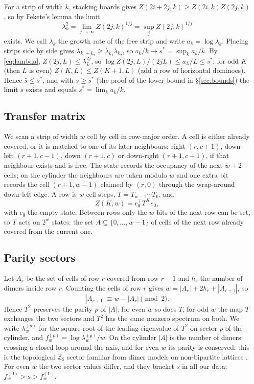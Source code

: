 \documentclass[11pt]{amsart}
\theoremstyle{definition}
\theoremstyle{remark}
\newcommand{\Z}{\mathbb{Z}}
\begin{document}
For a strip of width $k$, stacking boards gives $Z(2i + 2j, k) \ge Z(2i, k) Z(2j, k)$, so by
Fekete's lemma \cite{fekete1923} the limit
\begin{equation}\label{eq:lambda}
  \lambda_k^2 = \lim_{j \to \infty} Z(2j, k)^{1/j} = \sup_j Z(2j, k)^{1/j}
\end{equation}
exists. We call $\lambda_k$ the growth rate of the free strip and write $a_k = \log \lambda_k$.
Placing strips side by side gives $\lambda_{k_1 + k_2} \ge \lambda_{k_1}\lambda_{k_2}$, so
$a_k/k \to s^* = \sup_k a_k/k$. By \eqref{eq:lambda}, $Z(2j, L) \le \lambda_L^{2j}$, so
$\log Z(2j, L)/(2jL) \le a_L/L \le s^*$; for odd $K$ (then $L$ is even) $Z(K, L) \le Z(K+1, L)$
(add a row of horizontal dominoes). Hence $\bar s \le s^*$, and with $\underline s \ge s^*$ (the
proof of the lower bound in \S\ref{sec:bounds}) the limit $s$ exists and equals
$s^* = \lim_k a_k/k$.

\subsection{Transfer matrix}
We scan a strip of width $w$ cell by cell in row-major order. A cell is either already covered,
or it is matched to one of its later neighbours: right $(r, c+1)$, down-left $(r+1, c-1)$, down
$(r+1, c)$ or down-right $(r+1, c+1)$, if that neighbour exists and is free. The state records
the occupancy of the next $w + 2$ cells; on the cylinder the neighbours are taken modulo $w$ and
one extra bit records the cell $(r+1, w-1)$ claimed by $(r, 0)$ through the wrap-around
down-left edge. A row is $w$ cell steps, $T = T_{w-1}\cdots T_0$, and
\[
  Z(K, w) = e_0^{\top} T^K e_0,
\]
with $e_0$ the empty state. Between rows only the $w$ bits of the next row can be set, so $T$
acts on $2^w$ states: the set $A \subseteq \{0, \dots, w-1\}$ of cells of the next row already
covered from the current one.

\subsection{Parity sectors}
Let $A_r$ be the set of cells of row $r$ covered from row $r - 1$ and $h_r$ the number of
dimers inside row $r$. Counting the cells of row $r$ gives $w = |A_r| + 2h_r + |A_{r+1}|$, so
\[
  |A_{r+1}| \equiv w - |A_r| \pmod 2.
\]
Hence $T^2$ preserves the parity $p$ of $|A|$; for even $w$ so does $T$, for odd $w$ the map $T$
exchanges the two sectors and $T^2$ has the same nonzero spectrum on both. We write
$\lambda^{(p)}_w$ for the square root of the leading eigenvalue of $T^2$ on sector $p$ of the
cylinder, and $f_w^{(p)} = \log \lambda^{(p)}_w / w$. On the cylinder $|A|$ is the number of
dimers crossing a closed loop around the axis, and for even $w$ its parity is conserved: this is
the topological $\Z_2$ sector familiar from dimer models on non-bipartite lattices
\cite{moessnersondhi2001,yaokivelson2012}. For even $w$ the two sector values differ, and they
bracket $s$ in all our data: $f^{(0)}_w > s > f^{(1)}_w$.
\end{document}
